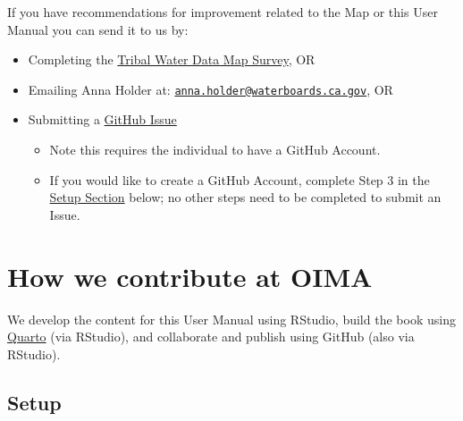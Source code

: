 \documentclass[
  letterpaper,
  DIV=11,
  numbers=noendperiod]{scrreprt}
\providecommand{\tightlist}{%
  \setlength{\itemsep}{0pt}\setlength{\parskip}{0pt}}
\begin{document}
\begin{tcolorbox}[enhanced jigsaw, colframe=quarto-callout-important-color-frame, bottomtitle=1mm, opacitybacktitle=0.6, breakable, bottomrule=.15mm, opacityback=0, colback=white, left=2mm, leftrule=.75mm, coltitle=black, rightrule=.15mm, toprule=.15mm, titlerule=0mm, toptitle=1mm, arc=.35mm, title=\textcolor{quarto-callout-important-color}{\faExclamation}\hspace{0.5em}{We want your feedback!}, colbacktitle=quarto-callout-important-color!10!white]

If you have recommendations for improvement related to the Map or this
User Manual you can send it to us by:

\begin{itemize}
\item
  Completing the \href{https://bit.ly/TWDM_Ideas}{Tribal Water Data Map
  Survey}, OR
\item
  Emailing Anna Holder at:
  \href{mailto:anna.holder@waterboards.ca.gov}{\nolinkurl{anna.holder@waterboards.ca.gov}},
  OR
\item
  Submitting a
  \href{https://github.com/CAWaterBoardDataCenter/tribal-water-data-map-manual/issues}{GitHub
  Issue}

  \begin{itemize}
  \tightlist
  \item
    Note this requires the individual to have a GitHub Account.
  \item
    If you would like to create a GitHub Account, complete Step 3 in the
    \href{https://cawaterboarddatacenter.github.io/tribal-water-data-map-manual/contribute.html\#setup}{Setup
    Section} below; no other steps need to be completed to submit an
    Issue.
  \end{itemize}
\end{itemize}

\end{tcolorbox}

\section{How we contribute at OIMA}\label{how-we-contribute-at-oima}

We develop the content for this User Manual using RStudio, build the
book using \href{https://quarto.org/}{Quarto} (via RStudio), and
collaborate and publish using GitHub (also via RStudio).

\subsection{Setup}\label{setup}
\end{document}
